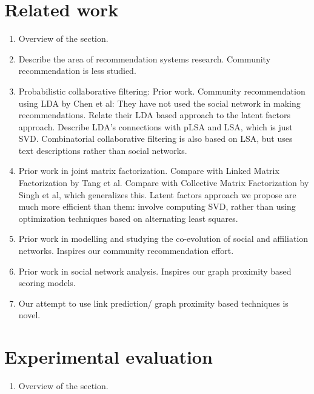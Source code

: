 \documentclass[11pt]{article}
\begin{document}
\section{Related work}
\begin{enumerate}
 \item Overview of the section.
 
 \item Describe the area of recommendation systems research.
  \subitem Community recommendation is less studied.
 
 \item Probabilistic collaborative filtering: Prior work.
  \subitem Community recommendation using LDA by Chen et al: They have not used the social network in making recommendations.
  \subitem Relate their LDA based approach to the latent factors approach. Describe LDA's connections with pLSA and LSA, which is just SVD.
  \subitem Combinatorial collaborative filtering is also based on LSA, but uses text descriptions rather than social networks.
 
 \item Prior work in joint matrix factorization.
  \subitem Compare with Linked Matrix Factorization by Tang et al.
  \subitem Compare with Collective Matrix Factorization by Singh et al, which generalizes this.
  \subitem Latent factors approach we propose are much more efficient than them: involve computing SVD, rather than using optimization techniques based on alternating least squares.
  
 \item Prior work in modelling and studying the co-evolution of social and affiliation networks.
 \subitem Inspires our community recommendation effort.
 
 \item Prior work in social network analysis.
  \subitem Inspires our graph proximity based scoring models.
 
 \item Our attempt to use link prediction/ graph proximity based techniques is novel.
\end{enumerate}

\section{Experimental evaluation}
\begin{enumerate}
 \item Overview of the section.
\end{enumerate}
 
\end{document}
